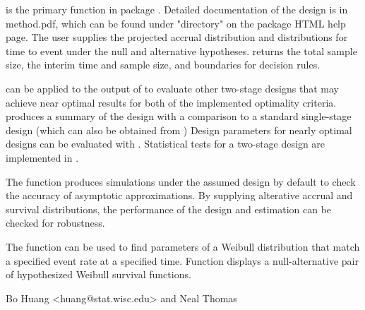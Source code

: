 \begin{Description}\relax
{} is the primary function in package
.  Detailed documentation of the design is in
method.pdf, which can be found under "directory" on the package HTML
help page.  The user supplies the projected accrual distribution and
distributions for time to event under the null and alternative
hypotheses.   returns the total sample size, the
interim time and sample size, and boundaries for decision rules.

 can be applied to the output of 
to evaluate other two-stage designs that may achieve near optimal
results for both of the implemented optimality criteria.
 produces a summary of the design with a comparison to a
standard single-stage design (which can also be obtained from
)  Design parameters for nearly optimal designs can be
evaluated with .  Statistical tests for a two-stage
design are implemented in .

The function  produces simulations under the assumed
design by default to check the accuracy of asymptotic approximations.
By supplying alterative accrual and survival distributions, the
performance of the design and estimation can be checked for robustness.

The function  can be used to find parameters of a
Weibull distribution that match a specified event rate at a specified
time.  Function  displays a null-alternative pair
of hypothesized Weibull survival functions.
\end{Description}
\begin{Details}\relax
{}
\end{Details}
\begin{Author}\relax
Bo Huang <huang@stat.wisc.edu> and Neal Thomas
\end{Author}
\begin{SeeAlso}\relax
{}
\end{SeeAlso}

